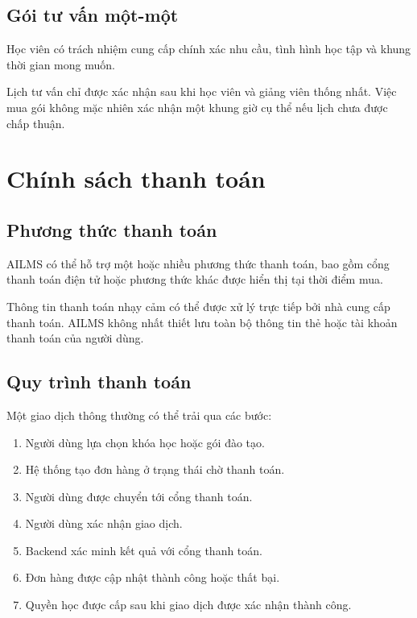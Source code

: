 \documentclass[12pt,a4paper]{article}
\begin{document}
\subsection{Gói tư vấn một-một}

Học viên có trách nhiệm cung cấp chính xác nhu cầu, tình hình học tập
và khung thời gian mong muốn.

Lịch tư vấn chỉ được xác nhận sau khi học viên và giảng viên thống nhất.
Việc mua gói không mặc nhiên xác nhận một khung giờ cụ thể nếu lịch chưa được chấp thuận.

\section{Chính sách thanh toán}

\subsection{Phương thức thanh toán}

AILMS có thể hỗ trợ một hoặc nhiều phương thức thanh toán,
bao gồm cổng thanh toán điện tử hoặc phương thức khác được hiển thị tại thời điểm mua.

Thông tin thanh toán nhạy cảm có thể được xử lý trực tiếp bởi nhà cung cấp thanh toán.
AILMS không nhất thiết lưu toàn bộ thông tin thẻ hoặc tài khoản thanh toán của người dùng.

\subsection{Quy trình thanh toán}

Một giao dịch thông thường có thể trải qua các bước:

\begin{enumerate}
    \item Người dùng lựa chọn khóa học hoặc gói đào tạo.
    \item Hệ thống tạo đơn hàng ở trạng thái chờ thanh toán.
    \item Người dùng được chuyển tới cổng thanh toán.
    \item Người dùng xác nhận giao dịch.
    \item Backend xác minh kết quả với cổng thanh toán.
    \item Đơn hàng được cập nhật thành công hoặc thất bại.
    \item Quyền học được cấp sau khi giao dịch được xác nhận thành công.
\end{enumerate}
\end{document}
